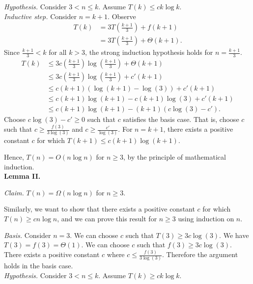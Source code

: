 \begin{enumerate}
\textit{Hypothesis. }Consider $3<n\leq k$. Assume $T(k)\leq ck\log k$.\\

\textit{Inductive step. }Consider $n=k+1$. Observe
\begin{align*}
T(k)&=3T\left(\frac{k+1}{3}\right)+f(k+1)\\
&=3T\left(\frac{k+1}{3}\right)+\Theta(k+1).
\end{align*}
Since $\frac{k+1}{3}<k$ for all $k>3$, the strong induction hypothesis holds for $n=\frac{k+1}{3}$.
\begin{align*}
T(k)&\leq 3c\left(\frac{k+1}{3}\right)\log\left(\frac{k+1}{3}\right)+\Theta(k+1)\\
&\leq 3c\left(\frac{k+1}{3}\right)\log\left(\frac{k+1}{3}\right)+c'(k+1)\\
&\leq c(k+1)(\log(k+1)-\log(3))+c'(k+1)\\
&\leq c(k+1)\log(k+1)-c(k+1)\log(3)+c'(k+1)\\
&\leq c(k+1)\log(k+1)-(k+1)(c\log(3)-c').
\end{align*}
Choose $c\log(3)-c'\geq 0$ such that $c$ satisfies the basis case. That is, choose $c$ such that $c\geq\frac{f(3)}{3\log(3)}$ and $c\geq\frac{c'}{\log(3)}$. For $n=k+1$, there exists a positive constant $c$ for which $T(k+1)\leq c(k+1)\log(k+1)$. 

Hence, $T(n)=O(n\log n)$ for $n\geq 3$, by the principle of mathematical induction.\\

\textbf{Lemma II. }

\textit{Claim. }$T(n)=\Omega(n\log n)$ for $n\geq 3$.

Similarly, we want to show that there exists a positive constant $c$ for which $T(n)\geq cn\log n$, and we can prove this result for $n\geq 3$ using induction on $n$.

\textit{Basis. }Consider $n=3$. We can choose $c$ such that $T(3)\geq 3c\log(3)$. We have $T(3)=f(3)=\Theta(1)$. We can choose $c$ such that $f(3)\geq 3c\log(3)$. There exists a positive constant $c$ where $c\leq\frac{f(3)}{3\log(3)}$. Therefore the argument holds in the basis case.\\

\textit{Hypothesis. }Consider $3<n\leq k$. Assume $T(k)\geq ck\log k$.\\


\end{enumerate}
